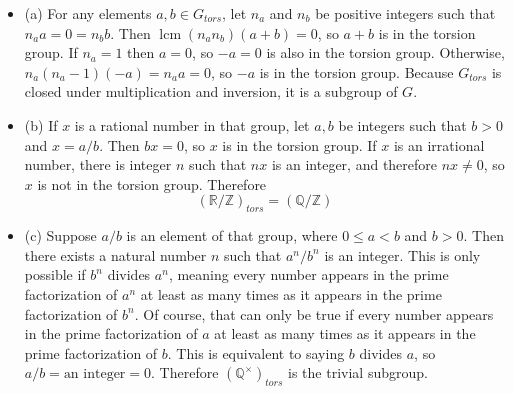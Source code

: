 \documentclass[12pt]{article}
\begin{document}
\begin{itemize}
    \item (a) For any elements $a, b \in G_{tors}$, let $n_a$ and $n_b$ be positive integers such that $n_a a = 0 = n_b b$. Then $\operatorname{lcm}(n_a n_b) (a+b) = 0$, so $a+b$ is in the torsion group. If $n_a=1$ then $a=0$, so $-a=0$ is also in the torsion group. Otherwise, $n_a (n_a - 1) (-a) = n_a a = 0$, so $-a$ is in the torsion group. Because $G_{tors}$ is closed under multiplication and inversion, it is a subgroup of $G$.
    \item (b) If $x$ is a rational number in that group, let $a, b$ be integers such that $b > 0$ and $x=a/b$. Then $bx=0$, so $x$ is in the torsion group. If $x$ is an irrational number, there is integer $n$ such that $nx$ is an integer, and therefore $nx \neq 0$, so $x$ is not in the torsion group. Therefore
        \[ ( \mathbb{R} / \mathbb{Z})_{tors}  = ( \mathbb{Q} / \mathbb{Z}) \]
    \item (c) Suppose $a/b$ is an element of that group, where $0 \leq a < b$ and $b > 0$. Then there exists a natural number $n$ such that $a^n/b^n$ is an integer. This is only possible if $b^n$ divides $a^n$, meaning every number appears in the prime factorization of $a^n$ at least as many times as it appears in the prime factorization of $b^n$. Of course, that can only be true if every number appears in the prime factorization of $a$ at least as many times as it appears in the prime factorization of $b$. This is equivalent to saying $b$ divides $a$, so $a/b=\text{an integer}=0$. Therefore $( \mathbb{Q}^\times)_{tors}$ is the trivial subgroup.
\end{itemize}

\section{}
\noindent{}\bigskip

\section{}
\noindent{}\bigskip

\section{}
\noindent{}\bigskip
\end{document}
